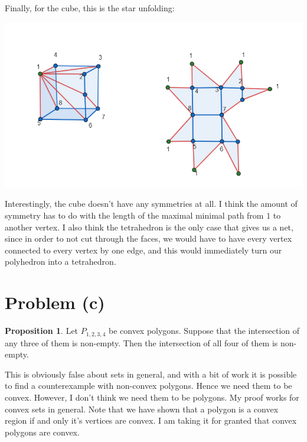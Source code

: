 \documentclass[12pt]{article}
\theoremstyle{definition}
\newtheorem{proposition}{Proposition}
\begin{document}
Finally, for the cube, this is the star unfolding:

\includegraphics[scale=0.5]{cube_unfolding.png} 

Interestingly, the cube doesn't have any symmetries at all. I think the amount of symmetry has to do with the length of the maximal minimal path from $1$ to another vertex. I also think the tetrahedron is the only case that gives us a net, since in order to not cut through the faces, we would have to have every vertex connected to every vertex by one edge, and this would immediately turn our polyhedron into a tetrahedron.



\section{Problem (c)}

\begin{proposition} Let $P_{1,2,3,4}$ be convex polygons. Suppose that the intersection of any three of them is non-empty. Then the intersection of all four of them is non-empty.
\end{proposition}

This is obviously false about sets in general, and with a bit of work it is possible to find a counterexample with non-convex polygons. Hence we need them to be convex. However, I don't think we need them to be polygons. My proof works for convex sets in general. Note that we have shown that a polygon is a convex region if and only it's vertices are convex. I am taking it for granted that convex polygons are convex.
\end{document}
